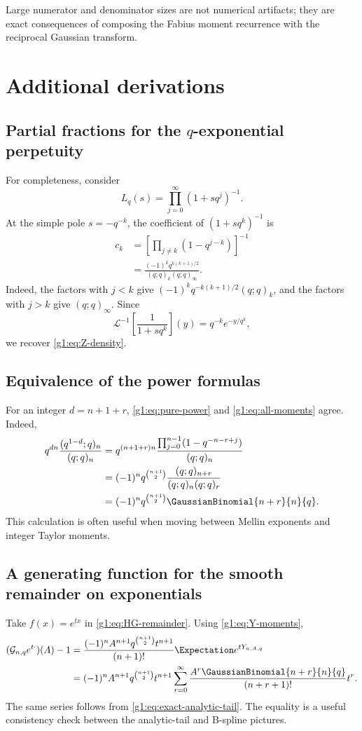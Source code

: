 Large numerator and denominator sizes are not numerical artifacts; they are
exact consequences of composing the Fabius moment recurrence with the
reciprocal Gaussian transform.


\section{Additional derivations}

\subsection{Partial fractions for the $q$-exponential perpetuity}

For completeness, consider
\[
 L_q(s)=\prod_{j=0}^{\infty}(1+sq^j)^{-1}.
\]
At the simple pole $s=-q^{-k}$, the coefficient of
$(1+sq^k)^{-1}$ is
\begin{align*}
 c_k
 &=\left[\prod_{j\ne k}(1-q^{j-k})\right]^{-1}\\
 &=\frac{(-1)^kq^{k(k+1)/2}}{(q;q)_k(q;q)_\infty}.
\end{align*}
Indeed, the factors with $j<k$ give
$(-1)^kq^{-k(k+1)/2}(q;q)_k$, and the factors with $j>k$ give
$(q;q)_\infty$.  Since
\[
 \mathcal L^{-1}\left[\frac1{1+sq^k}\right](y)
 =q^{-k}e^{-y/q^k},
\]
we recover \eqref{g1:eq:Z-density}.

\subsection{Equivalence of the power formulas}

For an integer $d=n+1+r$, \eqref{g1:eq:pure-power} and
\eqref{g1:eq:all-moments} agree.  Indeed,
\begin{align*}
 q^{dn}\frac{(q^{1-d};q)_n}{(q;q)_n}
 &=q^{(n+1+r)n}
 \frac{\prod_{j=0}^{n-1}(1-q^{-n-r+j})}{(q;q)_n}\\
 &=(-1)^nq^{\binom{n+1}{2}}
 \frac{(q;q)_{n+r}}{(q;q)_n(q;q)_r}\\
 &=(-1)^nq^{\binom{n+1}{2}}\GaussianBinomial{n+r}{n}{q}.
\end{align*}
This calculation is often useful when moving between Mellin exponents and
integer Taylor moments.

\subsection{A generating function for the smooth remainder on exponentials}

Take $f(x)=e^{tx}$ in \eqref{g1:eq:HG-remainder}.  Using
\eqref{g1:eq:Y-moments},
\begin{align}
 (\Gc_{n,q}e^{t\cdot})(A)-1
 &=\frac{(-1)^nA^{n+1}q^{\binom{n+1}{2}}t^{n+1}}{(n+1)!}
 \Expectation e^{tY_{n,A,q}}\notag\\
 &=(-1)^nA^{n+1}q^{\binom{n+1}{2}}t^{n+1}
 \sum_{r=0}^{\infty}
 \frac{A^r\GaussianBinomial{n+r}{n}{q}}{(n+r+1)!}t^r.
 \label{g1:eq:exp-remainder}
\end{align}
The same series follows from \eqref{g1:eq:exact-analytic-tail}.  The equality is a
useful consistency check between the analytic-tail and B-spline pictures.


